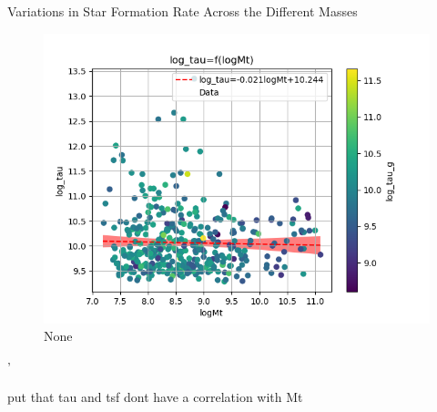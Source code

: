 \documentclass[presentation]{beamer}
\begin{document}
\begin{frame}[label={sec:orgbd7dd9c}]{Variations in Star Formation Rate Across the Different Masses}
\begin{figure}[!htpb]
\centering
\includegraphics[width=.9\linewidth]{./figs/logMt-log_tau-color_log_tau_g.png}
\caption{\label{fig:None}None}
\end{figure}'

\begin{block}{put that tau and tsf dont have a correlation with Mt}
\pagebreak
\printbibliography
\end{block}
\end{frame}
\end{document}
